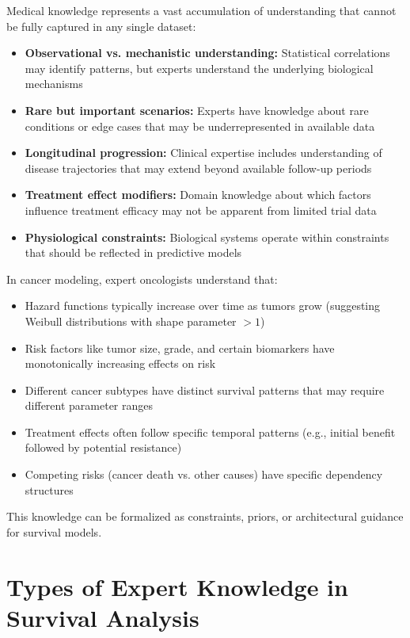 Medical knowledge represents a vast accumulation of understanding that cannot be fully captured in any single dataset:

\begin{itemize}
    \item \textbf{Observational vs. mechanistic understanding:} Statistical correlations may identify patterns, but experts understand the underlying biological mechanisms
    \item \textbf{Rare but important scenarios:} Experts have knowledge about rare conditions or edge cases that may be underrepresented in available data
    \item \textbf{Longitudinal progression:} Clinical expertise includes understanding of disease trajectories that may extend beyond available follow-up periods
    \item \textbf{Treatment effect modifiers:} Domain knowledge about which factors influence treatment efficacy may not be apparent from limited trial data
    \item \textbf{Physiological constraints:} Biological systems operate within constraints that should be reflected in predictive models
\end{itemize}

\begin{examplebox}[title=Expert Knowledge in Cancer Prognosis]
In cancer modeling, expert oncologists understand that:
\begin{itemize}
    \item Hazard functions typically increase over time as tumors grow (suggesting Weibull distributions with shape parameter $> 1$)
    \item Risk factors like tumor size, grade, and certain biomarkers have monotonically increasing effects on risk
    \item Different cancer subtypes have distinct survival patterns that may require different parameter ranges
    \item Treatment effects often follow specific temporal patterns (e.g., initial benefit followed by potential resistance)
    \item Competing risks (cancer death vs. other causes) have specific dependency structures
\end{itemize}
This knowledge can be formalized as constraints, priors, or architectural guidance for survival models.
\end{examplebox}

\section{Types of Expert Knowledge in Survival Analysis}

